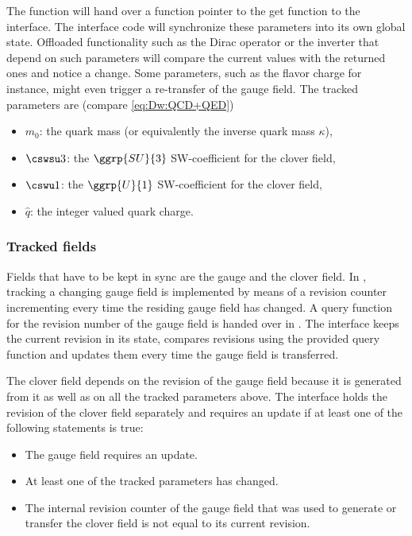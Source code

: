The  function will hand over a function pointer to the get function  to the interface.
The interface code will synchronize these parameters into its own global state.
Offloaded functionality such as the Dirac operator or the inverter that depend on such parameters will compare the current values with the returned ones and notice a change.
Some parameters, such as the flavor charge  for instance, might even trigger a re-transfer of the gauge field.
The tracked parameters are (compare \cref{eq:Dw:QCD+QED})
\begin{itemize}
  \item $m_0$: the quark mass (or equivalently the inverse quark mass $\kappa$),
  \item $\cswsu3$: the $\ggrp{SU}{3}$ SW-coefficient for the clover field,
  \item $\cswu1$: the $\ggrp{U}{1}$ SW-coefficient for the clover field,
  \item $\hat{q}$: the integer valued quark charge.
\end{itemize}

\subsubsection{Tracked fields}

Fields that have to be kept in sync are the gauge and the clover field.
In \openqxd, tracking a changing gauge field is implemented by means of a revision counter incrementing every time the residing gauge field has changed.
A query function for the revision number of the gauge field is handed over in .
The interface keeps the current revision in its state, compares revisions using the provided query function and updates them every time the gauge field is transferred.

The clover field depends on the revision of the gauge field because it is generated from it as well as on all the tracked parameters above.
The interface holds the revision of the clover field separately and requires an update if at least one of the following statements is true:
\begin{itemize}
  \item The gauge field requires an update.
  \item At least one of the tracked parameters has changed.
  \item The internal revision counter of the gauge field that was used to generate or transfer the clover field is not equal to its current revision.
\end{itemize}

